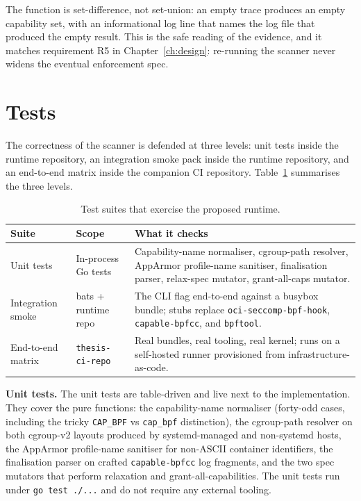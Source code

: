 The function is set-difference, not set-union: an empty trace produces an empty capability set, with an informational log line that names the log file that produced the empty result. This is the safe reading of the evidence, and it matches requirement R5 in Chapter~\ref{ch:design}: re-running the scanner never widens the eventual enforcement spec.

\section{Tests}\label{sec:impl-tests}

The correctness of the scanner is defended at three levels: unit tests inside the runtime repository, an integration smoke pack inside the runtime repository, and an end-to-end matrix inside the companion CI repository. Table~\ref{tab:tests} summarises the three levels.

\begin{table}[ht]
\centering
\caption{Test suites that exercise the proposed runtime.}
\label{tab:tests}
\begin{tabular}{p{3.6cm}p{4.0cm}p{7.6cm}}
\toprule
\textbf{Suite} & \textbf{Scope} & \textbf{What it checks} \\
\midrule
Unit tests & In-process Go tests & Capability-name normaliser, cgroup-path resolver, AppArmor profile-name sanitiser, finalisation parser, relax-spec mutator, grant-all-caps mutator. \\
Integration smoke & bats + runtime repo & The CLI flag end-to-end against a busybox bundle; stubs replace \texttt{oci-seccomp-bpf-hook}, \texttt{capable-bpfcc}, and \texttt{bpftool}. \\
End-to-end matrix & \texttt{thesis-ci-repo} & Real bundles, real tooling, real kernel; runs on a self-hosted runner provisioned from infrastructure-as-code. \\
\bottomrule
\end{tabular}
\end{table}

\textbf{Unit tests.} The unit tests are table-driven and live next to the implementation. They cover the pure functions: the capability-name normaliser (forty-odd cases, including the tricky \texttt{CAP\_BPF} vs \texttt{cap\_bpf} distinction), the cgroup-path resolver on both cgroup-v2 layouts produced by systemd-managed and non-systemd hosts, the AppArmor profile-name sanitiser for non-ASCII container identifiers, the finalisation parser on crafted \texttt{capable-bpfcc} log fragments, and the two spec mutators that perform relaxation and grant-all-capabilities. The unit tests run under \texttt{go test ./...} and do not require any external tooling.

